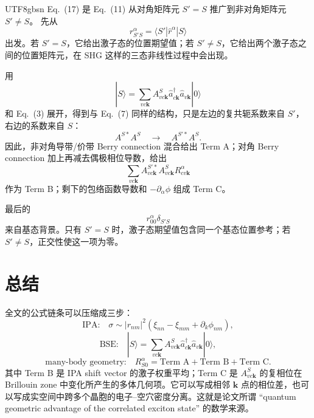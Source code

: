 \documentclass[11pt,a4paper]{article}
\begin{document}
\begin{CJK}{UTF8}{gbsn}
Eq.~(17) 是 Eq.~(11) 从对角矩阵元 $S'=S$ 推广到非对角矩阵元 $S'\ne S$。
先从
\[
r^\alpha_{S'S}
=\langle S'|\hat r^\alpha|S\rangle
\]
出发。若 $S'=S$，它给出激子态的位置期望值；若 $S'\ne S$，它给出两个激子态之间的位置矩阵元，在 SHG 这样的三态非线性过程中会出现。

用
\[
|S\rangle=\sum_{vc\bm k}A^S_{vc\bm k}
\hat a^\dagger_{c\bm k}\hat a_{v\bm k}|0\rangle
\]
和 Eq.~(3) 展开，得到与 Eq.~(7) 同样的结构，只是左边的复共轭系数来自 $S'$，右边的系数来自 $S$：
\[
A^{S*}A^S\quad\longrightarrow\quad A^{S'*}A^S.
\]
因此，非对角导带/价带 Berry connection 混合给出 Term A；对角 Berry connection 加上再减去偶极相位导数，给出
\[
\sum_{vc\bm k}A^{S'*}_{vc\bm k}A^S_{vc\bm k}R^\alpha_{cv\bm k}
\]
作为 Term B；剩下的包络函数导数和 $-\partial_\alpha\phi$ 组成 Term C。

最后的
\[
r^\alpha_{00}\delta_{S'S}
\]
来自基态背景。只有 $S'=S$ 时，激子态期望值包含同一个基态位置参考；若 $S'\ne S$，正交性使这一项为零。

\section*{总结}

全文的公式链条可以压缩成三步：
\[
\text{IPA:}\quad
\sigma\sim |r_{nm}|^2
(\xi_{nn}-\xi_{mm}+\partial_k\phi_{nm}),
\]
\[
\text{BSE:}\quad
|S\rangle=\sum_{vc\bm k}A^S_{vc\bm k}
\hat a^\dagger_{c\bm k}\hat a_{v\bm k}|0\rangle,
\]
\[
\text{many-body geometry:}\quad
R^\alpha_{S0}
=\text{Term A}+\text{Term B}+\text{Term C}.
\]
其中 Term B 是 IPA shift vector 的激子权重平均；Term C 是
$A^S_{vc\bm k}$ 的复相位在 Brillouin zone 中变化所产生的多体几何项。它可以写成相邻
$\bm k$ 点的相位差，也可以写成实空间中跨多个晶胞的电子--空穴密度分离。这就是论文所谓
``quantum geometric advantage of the correlated exciton state'' 的数学来源。

\ifPDFTeX
\end{CJK}
\fi
\end{document}
